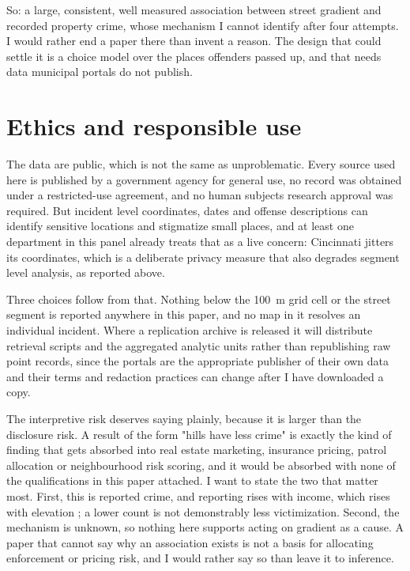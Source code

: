 \documentclass[12pt,letterpaper]{article}
\begin{document}
So: a large, consistent, well measured association between street gradient and
recorded property crime, whose mechanism I cannot identify after four attempts. I
would rather end a paper there than invent a reason. The design that could settle it
is a choice model over the places offenders passed up, and that needs data municipal
portals do not publish.

\section{Ethics and responsible use}

The data are public, which is not the same as unproblematic. Every source used here
is published by a government agency for general use, no record was obtained under a
restricted-use agreement, and no human subjects research approval was required. But
incident level coordinates, dates and offense descriptions can identify sensitive
locations and stigmatize small places, and at least one department in this panel
already treats that as a live concern: Cincinnati jitters its coordinates, which is a
deliberate privacy measure that also degrades segment level analysis, as reported
above.

Three choices follow from that. Nothing below the 100~m grid cell or the street
segment is reported anywhere in this paper, and no map in it resolves an individual
incident. Where a replication archive is released it will distribute retrieval scripts
and the aggregated analytic units rather than republishing raw point records, since
the portals are the appropriate publisher of their own data and their terms and
redaction practices can change after I have downloaded a copy.

The interpretive risk deserves saying plainly, because it is larger than the
disclosure risk. A result of the form "hills have less crime" is exactly the kind of
finding that gets absorbed into real estate marketing, insurance pricing, patrol
allocation or neighbourhood risk scoring, and it would be absorbed with none of the
qualifications in this paper attached. I want to state the two that matter most.
First, this is reported crime, and reporting rises with income, which rises with
elevation \citep{yebecker2018}; a lower count is not demonstrably less victimization.
Second, the mechanism is unknown, so nothing here supports acting on gradient as a
cause. A paper that cannot say why an association exists is not a basis for allocating
enforcement or pricing risk, and I would rather say so than leave it to inference.
\end{document}
